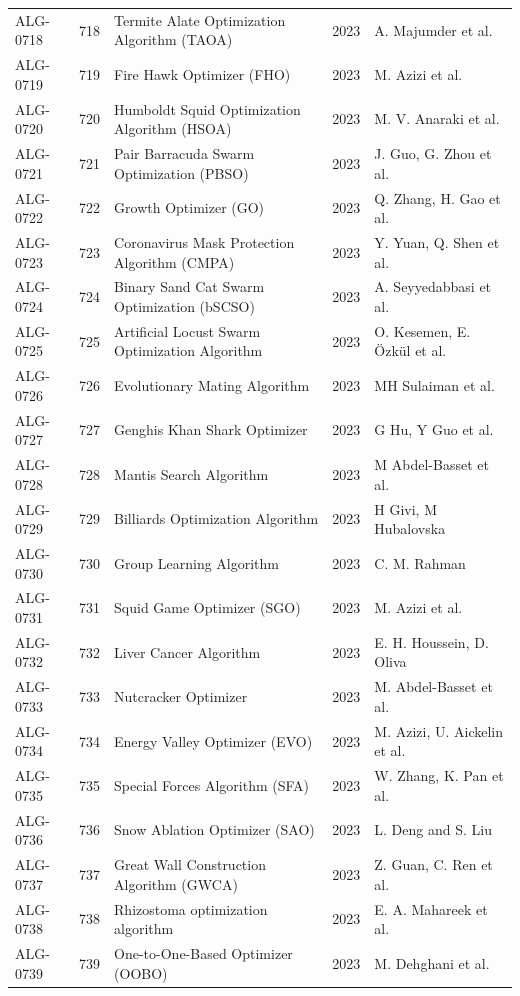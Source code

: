 \documentclass[8pt]{article}
\begin{document}
\begin{landscape}
\begin{longtable}{P{1.7cm}rP{10.0cm}rP{7.2cm}}
ALG-0718 & 718 & Termite Alate Optimization Algorithm (TAOA) & 2023 & A. Majumder et al. \\
ALG-0719 & 719 & Fire Hawk Optimizer (FHO) & 2023 & M. Azizi et al. \\
ALG-0720 & 720 & Humboldt Squid Optimization Algorithm (HSOA) & 2023 & M. V. Anaraki et al. \\
ALG-0721 & 721 & Pair Barracuda Swarm Optimization (PBSO) & 2023 & J. Guo, G. Zhou et al. \\
ALG-0722 & 722 & Growth Optimizer (GO) & 2023 & Q. Zhang, H. Gao et al. \\
ALG-0723 & 723 & Coronavirus Mask Protection Algorithm (CMPA) & 2023 & Y. Yuan, Q. Shen et al. \\
ALG-0724 & 724 & Binary Sand Cat Swarm Optimization (bSCSO) & 2023 & A. Seyyedabbasi et al. \\
ALG-0725 & 725 & Artificial Locust Swarm Optimization Algorithm & 2023 & O. Kesemen, E. Özkül et al. \\
ALG-0726 & 726 & Evolutionary Mating Algorithm & 2023 & MH Sulaiman et al. \\
ALG-0727 & 727 & Genghis Khan Shark Optimizer & 2023 & G Hu, Y Guo et al. \\
ALG-0728 & 728 & Mantis Search Algorithm & 2023 & M Abdel-Basset et al. \\
ALG-0729 & 729 & Billiards Optimization Algorithm & 2023 & H Givi, M Hubalovska \\
ALG-0730 & 730 & Group Learning Algorithm & 2023 & C. M. Rahman \\
ALG-0731 & 731 & Squid Game Optimizer (SGO) & 2023 & M. Azizi et al. \\
ALG-0732 & 732 & Liver Cancer Algorithm & 2023 & E. H. Houssein, D. Oliva \\
ALG-0733 & 733 & Nutcracker Optimizer & 2023 & M. Abdel-Basset et al. \\
ALG-0734 & 734 & Energy Valley Optimizer (EVO) & 2023 & M. Azizi, U. Aickelin et al. \\
ALG-0735 & 735 & Special Forces Algorithm (SFA) & 2023 & W. Zhang, K. Pan et al. \\
ALG-0736 & 736 & Snow Ablation Optimizer (SAO) & 2023 & L. Deng and S. Liu \\
ALG-0737 & 737 & Great Wall Construction Algorithm (GWCA) & 2023 & Z. Guan, C. Ren et al. \\
ALG-0738 & 738 & Rhizostoma optimization algorithm & 2023 & E. A. Mahareek et al. \\
ALG-0739 & 739 & One-to-One-Based Optimizer (OOBO) & 2023 & M. Dehghani et al. \\

\end{longtable}
\end{landscape}
\end{document}
